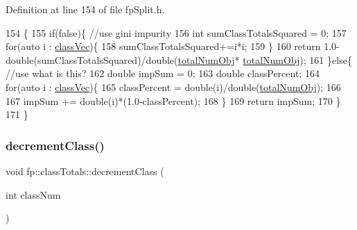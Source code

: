 Definition at line 154 of file fp\+Split.\+h.


\begin{DoxyCode}
154                                                  \{
155                 \textcolor{keywordflow}{if}(\textcolor{keyword}{false})\{ \textcolor{comment}{//use gini impurity}
156                     \textcolor{keywordtype}{int} sumClassTotalsSquared = 0;
157                     \textcolor{keywordflow}{for}(\textcolor{keyword}{auto} i : \hyperlink{classfp_1_1classTotals_af96102537592dbda8601d0235dfccfca}{classVec})\{
158                         sumClassTotalsSquared+=i*i;
159                     \}
160                     \textcolor{keywordflow}{return} 1.0-double(sumClassTotalsSquared)/double(\hyperlink{classfp_1_1classTotals_a97be63e3e4a1b7c553df839034828aae}{totalNumObj}*
      \hyperlink{classfp_1_1classTotals_a97be63e3e4a1b7c553df839034828aae}{totalNumObj});
161                 \}\textcolor{keywordflow}{else}\{ \textcolor{comment}{//use what is this?}
162                     \textcolor{keywordtype}{double} impSum = 0;
163                     \textcolor{keywordtype}{double} classPercent;
164                     \textcolor{keywordflow}{for}(\textcolor{keyword}{auto} i : \hyperlink{classfp_1_1classTotals_af96102537592dbda8601d0235dfccfca}{classVec})\{
165                         classPercent = double(i)/double(\hyperlink{classfp_1_1classTotals_a97be63e3e4a1b7c553df839034828aae}{totalNumObj});
166 
167                         impSum += double(i)*(1.0-classPercent);
168                     \}
169                     \textcolor{keywordflow}{return} impSum;
170                 \}
171             \}
\end{DoxyCode}
\mbox{\label{classfp_1_1classTotals_af388dc1e664488603f7834da2f097a06}} 
\subsubsection{\texorpdfstring{decrement\+Class()}{decrementClass()}}
{\footnotesize\ttfamily void fp\+::class\+Totals\+::decrement\+Class (\begin{DoxyParamCaption}\item[{int}]{class\+Num }\end{DoxyParamCaption})\hspace{0.3cm}{\ttfamily [inline]}}



